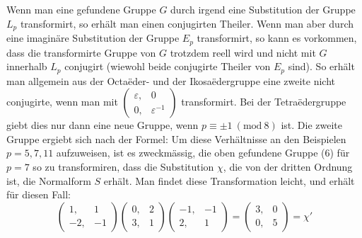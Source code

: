 Wenn man eine gefundene Gruppe $G$ durch irgend eine Substitution der Gruppe $L_p$ transformirt, so erhält man einen conjugirten Theiler. Wenn man aber durch eine imaginäre Substitution der Gruppe $E_p$ transformirt, so kann es vorkommen, dass die transformirte Gruppe von $G$ trotzdem reell wird und nicht mit $G$ innerhalb $L_p$ conjugirt (wiewohl beide conjugirte Theiler von $E_p$ sind). So erhält man allgemein aus der Octaëder- und der Ikosaëdergruppe eine zweite nicht conjugirte, wenn man
mit $\begin{pmatrix} \varepsilon, & 0 \\ 0, & \varepsilon^{-1} \end{pmatrix}$ transformirt. Bei der Tetraëdergruppe giebt dies nur dann eine neue Gruppe, wenn $p\equiv\pm 1\ (\mathrm{mod}\ 8)$ ist. Die zweite Gruppe ergiebt sich nach der Formel:
Um diese Verhältnisse an den Beispielen $p=5,7,11$ aufzuweisen, ist es zweckmässig, die oben gefundene Gruppe (6) für $p=7$ so zu transformiren, dass die Substitution $\chi$, die von der dritten Ordnung ist, die Normalform $S$ erhält. Man findet diese Transformation leicht, und erhält für diesen Fall:
\[
\begin{pmatrix} 1, & 1 \\ -2, & -1 \end{pmatrix}
\begin{pmatrix} 0, & 2 \\ 3, & 1 \end{pmatrix}
\begin{pmatrix} -1, & -1 \\ 2, & 1 \end{pmatrix}
=
\begin{pmatrix} 3, & 0 \\ 0, & 5 \end{pmatrix}
= \chi'
\]
